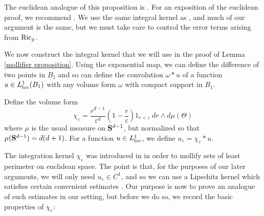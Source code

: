 The euclidean analogue of this proposition is \cite[Lemma 5.5]{Miranda66}.
For an exposition of the euclidean proof, we recommend \cite[Chapter 7]{Giusti77}.
We use the same integral kernel as \cite[Chapter 7]{Giusti77}, and much of our argument is the same, but we must take care to control the error terms arising from $\mathrm{Ric}_g$.

We now construct the integral kernel that we will use in the proof of Lemma \ref{mollifier proposition}.
Using the exponential map, we can define the difference of two points in $B_1$ and so can define the convolution $\omega * u$ of a function $u \in L^1_{\mathrm{loc}}(B_1)$ with any volume form $\omega$ with compact support in $B_1$.

\begin{definition}
Define the volume form
$$\chi_\varepsilon = \frac{r^{d - 1}}{\varepsilon^d}\left(1 - \frac{r}{\varepsilon}\right)1_{r < \varepsilon} ~dr \wedge d\mu(\Theta)$$
where $\mu$ is the usual measure on $\mathbf S^{d - 1}$, but normalized so that $\mu(\mathbf S^{d - 1}) = d(d + 1)$.
For a function $u \in L^1_{\mathrm{loc}}$, we define $u_\varepsilon = \chi_\varepsilon * u$.
\end{definition}

The integration kernel $\chi_\varepsilon$ was introduced in \cite[Chapter 7]{Giusti77} in order to mollify sets of least perimeter on euclidean space.
The point is that, for the purposes of our later arguments, we will only need $u_\varepsilon \in C^1$, and so we can use a Lipschitz kernel which satisfies certain convenient estimates \cite[Lemmata 7.1--7.2]{Giusti77}.
Our purpose is now to prove an analogue of such estimates in our setting, but before we do so, we record the basic properties of $\chi_\varepsilon$:

